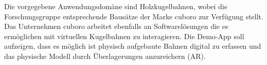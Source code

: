 Die vorgegebene Anwendungsdomäne sind Holzkugelbahnen, wobei die Forschungsgruppe entsprechende Bausätze der Marke cuboro zur Verfügung stellt. Das Unternehmen cuboro arbeitet ebenfalls an Softwarelösungen die es ermöglichen mit virtuellen Kugelbahnen zu interagieren. Die Demo-App soll aufzeigen, dass es möglich ist physisch aufgebaute Bahnen digital zu erfassen und das physische Modell durch Überlagerungen anzureichern (AR).